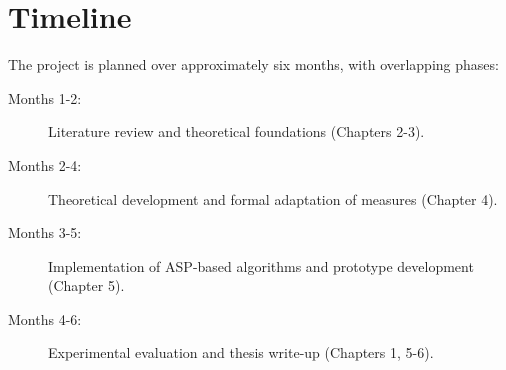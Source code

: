 \documentclass[proposal,english,palatino]{AIGpaper}
\begin{document}
\section{Timeline}

The project is planned over approximately six months, with overlapping phases:

\begin{description}
  \item[Months 1-2:] Literature review and theoretical foundations (Chapters 2-3).
  \item[Months 2-4:] Theoretical development and formal adaptation of measures (Chapter 4).
  \item[Months 3-5:] Implementation of \ac{ASP}-based algorithms and prototype development (Chapter 5).
  \item[Months 4-6:] Experimental evaluation and thesis write-up (Chapters 1, 5-6).
\end{description}

\newpage

\addreferences
\end{document}
